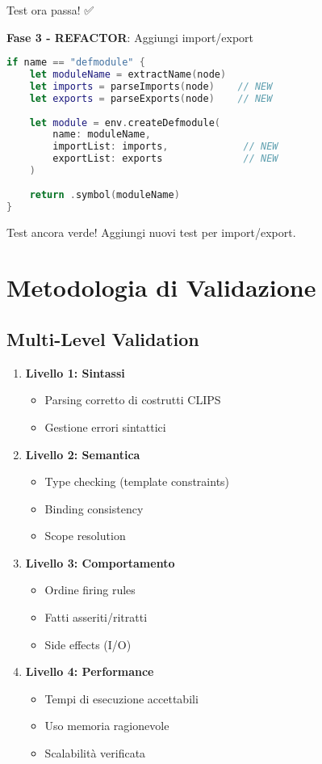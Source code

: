 Test ora passa! ✅

\textbf{Fase 3 - REFACTOR}: Aggiungi import/export

\begin{lstlisting}[language=Swift]
if name == "defmodule" {
    let moduleName = extractName(node)
    let imports = parseImports(node)    // NEW
    let exports = parseExports(node)    // NEW
    
    let module = env.createDefmodule(
        name: moduleName,
        importList: imports,             // NEW
        exportList: exports              // NEW
    )
    
    return .symbol(moduleName)
}
\end{lstlisting}

Test ancora verde! Aggiungi nuovi test per import/export.

\section{Metodologia di Validazione}

\subsection{Multi-Level Validation}

\begin{enumerate}
\item \textbf{Livello 1: Sintassi}
   \begin{itemize}
   \item Parsing corretto di costrutti CLIPS
   \item Gestione errori sintattici
   \end{itemize}

\item \textbf{Livello 2: Semantica}
   \begin{itemize}
   \item Type checking (template constraints)
   \item Binding consistency
   \item Scope resolution
   \end{itemize}

\item \textbf{Livello 3: Comportamento}
   \begin{itemize}
   \item Ordine firing rules
   \item Fatti asseriti/ritratti
   \item Side effects (I/O)
   \end{itemize}

\item \textbf{Livello 4: Performance}
   \begin{itemize}
   \item Tempi di esecuzione accettabili
   \item Uso memoria ragionevole
   \item Scalabilità verificata
   \end{itemize}
\end{enumerate}

